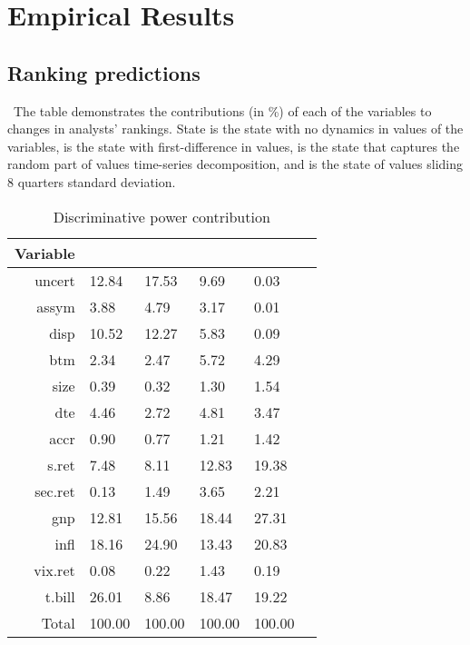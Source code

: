 \documentclass[a4paper,12pt,openright,notitlepage]{report}\usepackage[]{graphicx}\usepackage[]{color}
\begin{document}


\section{Empirical Results}
\label{ch4-sec:results}

\subsection{Ranking predictions}

\begin{table}
\caption{Discriminative power contribution}
\ The table demonstrates the contributions (in \%) of each of the variables to changes in analysts' rankings. State \last{} is the state with no dynamics in values of the variables, \diff{} is the state with first-difference in values, \random{} is the state that captures the random part of values time-series decomposition,  and \rollsd{} is the state of values sliding 8 quarters standard deviation.

\begin{tabu} to 
\toprule
Variable&\last{}&\diff{}&\random{}&\rollsd{} \\
\midrule

 uncert & 12.84 & 17.53 & 9.69 & 0.03 \\ 
  assym & 3.88 & 4.79 & 3.17 & 0.01 \\ 
  disp & 10.52 & 12.27 & 5.83 & 0.09 \\ 
  btm & 2.34 & 2.47 & 5.72 & 4.29 \\ 
  size & 0.39 & 0.32 & 1.30 & 1.54 \\ 
  dte & 4.46 & 2.72 & 4.81 & 3.47 \\ 
  accr & 0.90 & 0.77 & 1.21 & 1.42 \\ 
  s.ret & 7.48 & 8.11 & 12.83 & 19.38 \\ 
  sec.ret & 0.13 & 1.49 & 3.65 & 2.21 \\ 
  gnp & 12.81 & 15.56 & 18.44 & 27.31 \\ 
  infl & 18.16 & 24.90 & 13.43 & 20.83 \\ 
  vix.ret & 0.08 & 0.22 & 1.43 & 0.19 \\ 
  t.bill & 26.01 & 8.86 & 18.47 & 19.22 \\ 
   \midrule 
Total & 100.00 & 100.00 & 100.00 & 100.00 \\ 
  

\bottomrule
\end{tabu}
\label{ch4:tab-dp}
\end{table}
\end{document}
